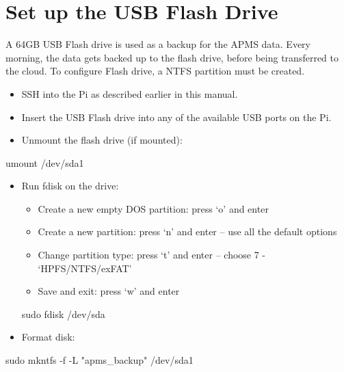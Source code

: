 \documentclass[
  letterpaper,
]{scrbook}
\newenvironment{Shaded}{\begin{snugshade}}{\end{snugshade}}
\newcommand{\AttributeTok}[1]{\textcolor[rgb]{0.40,0.45,0.13}{#1}}
\newcommand{\FunctionTok}[1]{\textcolor[rgb]{0.28,0.35,0.67}{#1}}
\newcommand{\NormalTok}[1]{\textcolor[rgb]{0.00,0.23,0.31}{#1}}
\newcommand{\StringTok}[1]{\textcolor[rgb]{0.13,0.47,0.30}{#1}}
\begin{document}
\section{Set up the USB Flash Drive}\label{set-up-the-usb-flash-drive}

A 64GB USB Flash drive is used as a backup for the APMS data. Every
morning, the data gets backed up to the flash drive, before being
transferred to the cloud. To configure Flash drive, a NTFS partition
must be created.

\begin{itemize}
\item
  SSH into the Pi as described earlier in this manual.
\item
  Insert the USB Flash drive into any of the available USB ports on the
  Pi.
\item
  Unmount the flash drive (if mounted):
\end{itemize}

\begin{Shaded}
\begin{Highlighting}[]
\FunctionTok{umount}\NormalTok{ /dev/sda1}
\end{Highlighting}
\end{Shaded}

\begin{itemize}
\item
  Run fdisk on the drive:

  \begin{itemize}
  \item
    Create a new empty DOS partition: press `o' and enter
  \item
    Create a new partition: press `n' and enter -- use all the default
    options
  \item
    Change partition type: press `t' and enter -- choose 7 -
    `HPFS/NTFS/exFAT'
  \item
    Save and exit: press `w' and enter
  \end{itemize}

\begin{Shaded}
\begin{Highlighting}[]
\FunctionTok{sudo}\NormalTok{ fdisk /dev/sda}
\end{Highlighting}
\end{Shaded}
\item
  Format disk:
\end{itemize}

\begin{Shaded}
\begin{Highlighting}[]
\FunctionTok{sudo}\NormalTok{ mkntfs }\AttributeTok{{-}f} \AttributeTok{{-}L} \StringTok{"apms\_backup"}\NormalTok{ /dev/sda1}
\end{Highlighting}
\end{Shaded}
\end{document}
